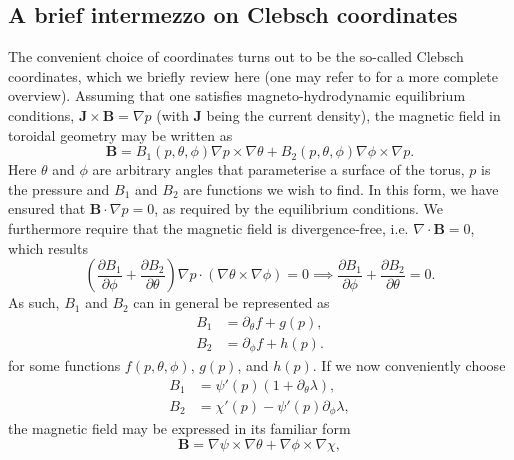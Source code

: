 \subsection*{A brief intermezzo on Clebsch coordinates}
The convenient choice of coordinates turns out to be the so-called Clebsch coordinates, which we briefly review here (one may refer to \citet{d2012flux} for a more complete overview). Assuming that one satisfies magneto-hydrodynamic equilibrium conditions, $\boldsymbol{J} \times \boldsymbol{B} = \nabla  p$ (with $\boldsymbol{J}$ being the current density), the magnetic field in toroidal geometry may be written as
\begin{equation}
    \boldsymbol{B} = B_1(p,\theta,\phi) \nabla p \times \nabla \theta + B_2(p,\theta,\phi) \nabla \phi \times \nabla p.
\end{equation}
Here $\theta$ and $\phi$ are arbitrary angles that parameterise a surface of the torus, $p$ is the pressure and $B_1$ and $B_2$ are functions we wish to find. In this form, we have ensured that $\boldsymbol{B} \cdot \nabla p = 0$, as required by the equilibrium conditions. We furthermore require that the magnetic field is divergence-free, i.e. $\nabla \cdot \boldsymbol{B} = 0$, which results 
\begin{equation}
    \left( \frac{\partial B_1}{\partial \phi} + \frac{\partial B_2}{\partial \theta} \right) \nabla p \cdot \left( \nabla \theta \times \nabla \phi \right) = 0 \implies \frac{\partial B_1}{\partial \phi} + \frac{\partial B_2}{\partial \theta} = 0.
\end{equation}
As such, $B_1$ and $B_2$ can in general be represented as 
\begin{subequations}
\begin{alignat}{4}
B_1 &= \partial_\theta f + g(p), \\
B_2 &= \partial_\phi f   + h(p).
\end{alignat}
\end{subequations}
for some functions $f(p,\theta,\phi)$, $g(p)$, and $h(p)$. If we now conveniently choose
\begin{subequations}
\begin{alignat}{4}
B_1 &= \psi'(p) \left( 1 + \partial_\theta \lambda \right), \\
B_2 &= \chi'(p) - \psi'(p) \partial_\phi \lambda,
\end{alignat}
\end{subequations}
the magnetic field may be expressed in its familiar form
\begin{equation}
    \boldsymbol{B} = \nabla \psi \times \nabla \theta + \nabla \phi \times \nabla \chi,
\end{equation}
